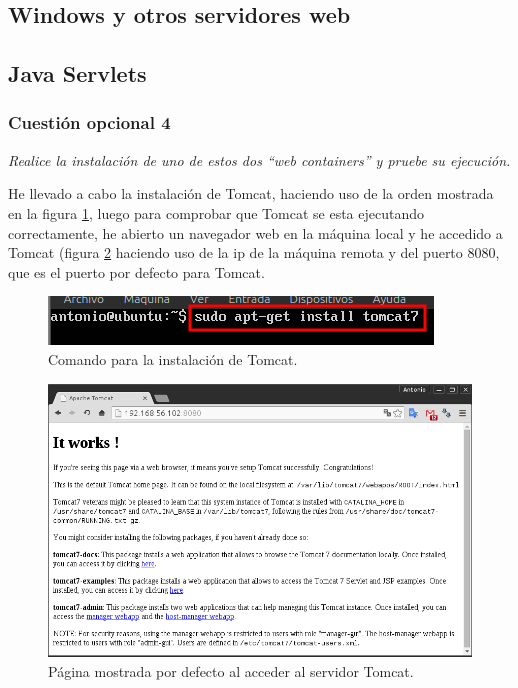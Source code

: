\subsection{Windows y otros servidores web}





\subsection{Java Servlets}
\subsubsection{Cuestión opcional 4}
\textit{Realice la instalación de uno de estos dos “web containers” y pruebe su ejecución.}
\newline

He llevado a cabo la instalación de Tomcat, haciendo uso de la orden mostrada en la figura \ref{tc1}, luego para comprobar que Tomcat se esta ejecutando correctamente, he abierto un navegador web en la máquina local y he accedido a Tomcat (figura \ref{tc2} haciendo uso de la ip de la máquina remota y del puerto 8080, que es el puerto por defecto para Tomcat. \cite{tomcat}

\begin{figure}[H]
    \begin{center}
        \includegraphics[scale=0.8]{imagenes/tc1}
        \caption{Comando para la instalación de Tomcat.}
        \label{tc1}
    \end{center}
\end{figure}

\begin{figure}[H]
    \begin{center}
        \includegraphics[scale=0.5]{imagenes/tc2}
        \caption{Página mostrada por defecto al acceder al servidor Tomcat.}
        \label{tc2}
    \end{center}
\end{figure}




